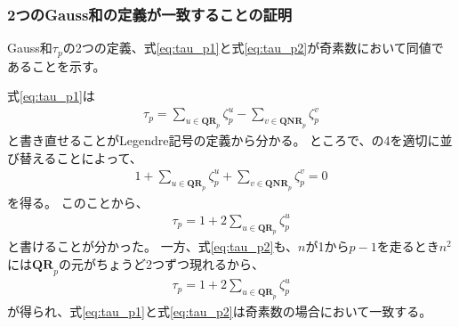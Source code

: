 \subsubsection{2つのGauss和の定義が一致することの証明}\label{sss:proof_gauss_sum_1}
Gauss和$\tau_p$の2つの定義、式\ref{eq:tau_p1}と式\ref{eq:tau_p2}が奇素数において同値であることを示す。

式\ref{eq:tau_p1}は
\begin{align*}
\tau_p = \sum_{u \in \mathbf{QR}_p} \zeta_p^u - \sum_{v \in \mathbf{QNR}_p} \zeta_p^v
\end{align*}
と書き直せることがLegendre記号の定義から分かる。
ところで、の4を適切に並び替えることによって、
\begin{align*}
1 + \sum_{u \in \mathbf{QR}_p} \zeta_p^u + \sum_{v \in \mathbf{QNR}_p} \zeta_p^v = 0
\end{align*}
を得る。
このことから、
\begin{align*}
\tau_p = 1 + 2\sum_{u \in \mathbf{QR}_p} \zeta_p^u
\end{align*}
と書けることが分かった。
一方、式\ref{eq:tau_p2}も、$n$が1から$p-1$を走るとき$n^2$には$\mathbf{QR}_p$の元がちょうど2つずつ現れるから、
\begin{align*}
\tau_p = 1 + 2\sum_{u \in \mathbf{QR}_p} \zeta_p^u
\end{align*}
が得られ、式\ref{eq:tau_p1}と式\ref{eq:tau_p2}は奇素数の場合において一致する。


